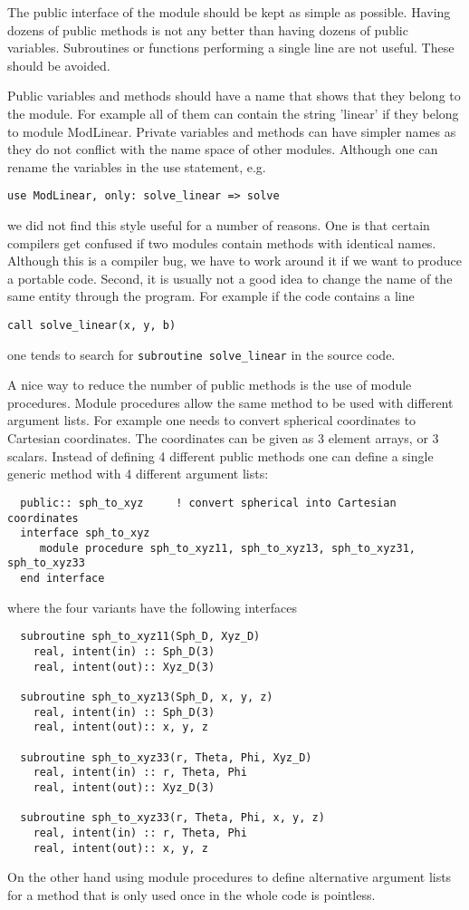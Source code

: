 \documentclass{article}
\begin{document}
The public interface of the module should be kept as simple as possible. Having
dozens of public methods is not any better than having dozens of public 
variables. Subroutines or functions performing a single line are not useful.
These should be avoided.

Public variables and methods should have a name that shows that they belong
to the module. For example all of them can contain the string 'linear' if
they belong to module ModLinear. Private variables and methods can have
simpler names as they do not conflict with the name space of other modules.
Although one can rename the variables in the use statement, e.g.
\begin{verbatim}
use ModLinear, only: solve_linear => solve
\end{verbatim}
we did not find this style useful for a number of reasons. One is that certain
compilers get confused if two modules contain methods with identical names. 
Although this is a compiler bug, we have to work around it if we want to 
produce a portable code. Second, it is usually not a good idea to change
the name of the same entity through the program. For example if the code
contains a line
\begin{verbatim}
call solve_linear(x, y, b)
\end{verbatim}
one tends to search for {\tt subroutine solve\_linear} in the source code.

A nice way to reduce the number of public methods is the use of module
procedures. Module procedures allow the same method to be used with
different argument lists. For example one needs to convert spherical 
coordinates to Cartesian coordinates. The coordinates can be given as 
3 element arrays, or 3 scalars. Instead of defining 4 different public methods
one can define a single generic method with 4 different argument lists:
\begin{verbatim}
  public:: sph_to_xyz     ! convert spherical into Cartesian coordinates
  interface sph_to_xyz
     module procedure sph_to_xyz11, sph_to_xyz13, sph_to_xyz31, sph_to_xyz33
  end interface
\end{verbatim}
where the four variants have the following interfaces
\begin{verbatim}
  subroutine sph_to_xyz11(Sph_D, Xyz_D)
    real, intent(in) :: Sph_D(3)
    real, intent(out):: Xyz_D(3)

  subroutine sph_to_xyz13(Sph_D, x, y, z)
    real, intent(in) :: Sph_D(3)
    real, intent(out):: x, y, z

  subroutine sph_to_xyz33(r, Theta, Phi, Xyz_D)
    real, intent(in) :: r, Theta, Phi
    real, intent(out):: Xyz_D(3)

  subroutine sph_to_xyz33(r, Theta, Phi, x, y, z)
    real, intent(in) :: r, Theta, Phi
    real, intent(out):: x, y, z
\end{verbatim}
On the other hand using module procedures to define alternative argument
lists for a method that is only used once in the whole code is pointless.
\end{document}
